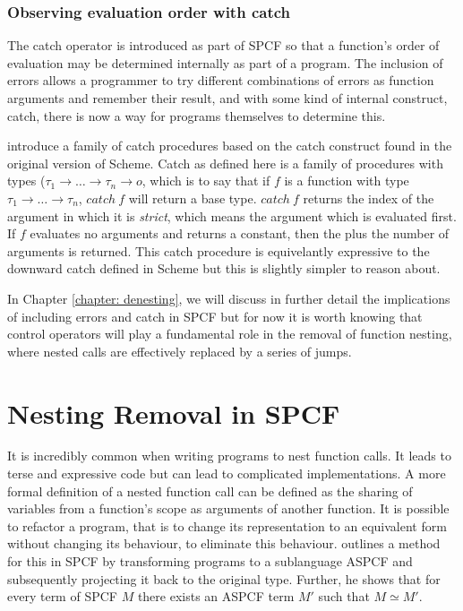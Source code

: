 \documentclass[12pt,a4paper]{report}
\theoremstyle{definition}
\theoremstyle{remark}
\begin{document}
\subsubsection{Observing evaluation order with catch}
The catch operator is introduced as part of SPCF so that a function's order of evaluation may be determined internally as part of a program. The inclusion of errors allows a programmer to try different combinations of errors as function arguments and remember their result, and with some kind of internal construct, catch, there is now a way for programs themselves to determine this.

\cite{cartwright_1992} introduce a family of catch procedures based on the catch construct found in the original version of Scheme. Catch as defined here is a family of procedures with types ($\tau_1 \rightarrow \dots \rightarrow \tau_n \rightarrow o$, which is to say that if $f$ is a function with type $\tau_1 \rightarrow \dots \rightarrow \tau_n$, $catch\ f$ will return a base type. $catch\ f$ returns the index of the argument in which it is \emph{strict}, which means the argument which is evaluated first. If $f$ evaluates no arguments and returns a constant, then the plus the number of arguments is returned. This catch procedure is equivelantly expressive to the downward catch defined in Scheme but this is slightly simpler to reason about. 

In Chapter \ref{chapter: denesting}, we will discuss in further detail the implications of including errors and catch in SPCF but for now it is worth knowing that control operators will play a fundamental role in the removal of function nesting, where nested calls are effectively replaced by a series of jumps.

\section{Nesting Removal in SPCF}\label{sec:nesting_removal}
It is incredibly common when writing programs to nest function calls. It leads to terse and expressive code but can lead to complicated implementations. A more formal definition of a nested function call can be defined as the sharing of variables from a function's scope as arguments of another function. It is possible to refactor a program, that is to change its representation to an equivalent form without changing its behaviour, to eliminate this behaviour. \cite{laird_2007} outlines a method for this in SPCF by transforming programs to a sublanguage ASPCF and subsequently projecting it back to the original type. Further, he shows that for every term of SPCF $M$ there exists an ASPCF term $M'$ such that $M \simeq M'$.
\end{document}
